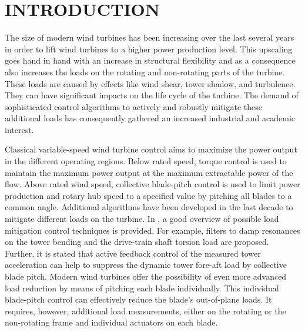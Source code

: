 \documentclass[times]{weauth}
\begin{document}
\section{INTRODUCTION}
The size of modern wind turbines has been increasing over the last several years in
order to lift wind turbines to a higher power production level. This upscaling
goes hand in hand with an increase in structural flexibility and as a
consequence also increases the loads on the rotating and non-rotating parts of
the turbine.
These loads are caused by effects like wind shear, tower shadow, and turbulence.
They can have significant impacts on the life cycle of the turbine.
The demand of sophisticated  control algorithms to actively and robustly
mitigate these additional loads %
has consequently gathered an increased industrial and academic interest.

Classical variable-speed wind turbine control aims to maximize the power
output in the different operating regions. Below rated speed, torque
control is used to maintain the maximum power output at the maximum extractable power of
the flow. Above rated wind speed, collective blade-pitch control is used to limit power
production and rotary hub speed to a specified value by pitching all blades to
a common angle. Additional algorithms have been developed in the last decade to mitigate different loads on the
turbine.
In \cite{Bossanyi00}, a good overview of possible load mitigation control
techniques is provided. For example, filters  to damp resonances on the tower
bending and the drive-train shaft torsion load are proposed. Further, it
is stated that active feedback control of the measured tower acceleration can
help to suppress the dynamic tower fore-aft load by collective blade pitch. Modern
wind turbines offer the possibility of even more advanced load reduction by
means of pitching each blade individually. This individual blade-pitch
control can effectively reduce the blade's out-of-plane loads. It requires, however, additional load measurements,
either on the rotating or the non-rotating frame \cite{Bossanyi03a} and individual actuators on each blade.
\end{document}
